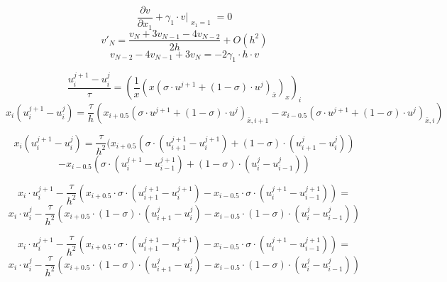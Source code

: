 \documentclass[fontsize=14pt,DIV=1,a4paper]{scrartcl}
\begin{document}
	\begin{equation}
		\frac{\partial v}{\partial x_1} + \gamma_1 \cdot v \Bigr|_{\substack{x_1=1}}= 0 
	\end{equation}
	\begin{equation}
		v'_N = \frac{v_N+3v_{N-1}-4v_{N-2}}{2h} + O(h^2)
	\end{equation}
	\begin{equation}
		v_{N-2}-4v_{N-1}+3v_N=-2\gamma_1\cdot h\cdot v 
	\end{equation}
	
	\newpage
	\begin{equation}
		\frac{u^{j+1}_i-u^j_i}{\tau} = (\frac{1}{x}(x(\sigma \cdot u^{j+1}+(1-\sigma) \cdot u^j)_{\bar{x}})_x)_i
	\end{equation}
	\begin{equation}
		x_i(u^{j+1}_i-u^j_i) = \frac{\tau}{h}(x_{i+0.5}(\sigma \cdot u^{j+1}+(1-\sigma) \cdot u^j)_{\bar{x},i+1} - x_{i-0.5}(\sigma \cdot u^{j+1}+(1-\sigma) \cdot u^j)_{\bar{x},i})
	\end{equation}
	
	\begin{equation}
		x_i(u^{j+1}_i-u^j_i) = \frac{\tau}{h^2}(
		  x_{i+0.5}(\sigma \cdot (u^{j+1}_{i+1}-u^{j+1}_{i})  +(1-\sigma) \cdot (u^j_{i+1}-u^{j}_{i}))
	\end{equation}
	\begin{equation}
		- x_{i-0.5}(\sigma \cdot (u^{j+1}_i    -u^{j+1}_{i-1})+(1-\sigma) \cdot (u^j_i-u^j_{i-1})
		)
	\end{equation}
	
	\begin{equation}
		x_i \cdot u^{j+1}_i - \frac{\tau}{h^2}(
		  x_{i+0.5}\cdot\sigma \cdot (u^{j+1}_{i+1}-u^{j+1}_{i})
		- x_{i-0.5}\cdot\sigma \cdot (u^{j+1}_i    -u^{j+1}_{i-1}))=
	\end{equation}
	\begin{equation}
		x_i \cdot u^j_i - \frac{\tau}{h^2}(
		  x_{i+0.5}\cdot(1- \sigma) \cdot (u^{j}_{i+1}-u^{j}_{i})
		- x_{i-0.5}\cdot(1- \sigma) \cdot (u^{j}_i    -u^{j}_{i-1}))
	\end{equation}
	
	\begin{equation}
		x_i \cdot u^{j+1}_i - \frac{\tau}{h^2}(
		  x_{i+0.5}\cdot\sigma \cdot (u^{j+1}_{i+1}-u^{j+1}_{i})
		- x_{i-0.5}\cdot\sigma \cdot (u^{j+1}_i    -u^{j+1}_{i-1}))=
	\end{equation}
	\begin{equation}
		x_i \cdot u^j_i - \frac{\tau}{h^2}(
		  x_{i+0.5}\cdot(1- \sigma) \cdot (u^{j}_{i+1}-u^{j}_{i})
		- x_{i-0.5}\cdot(1- \sigma) \cdot (u^{j}_i    -u^{j}_{i-1}))
	\end{equation}
	
\end{document}

